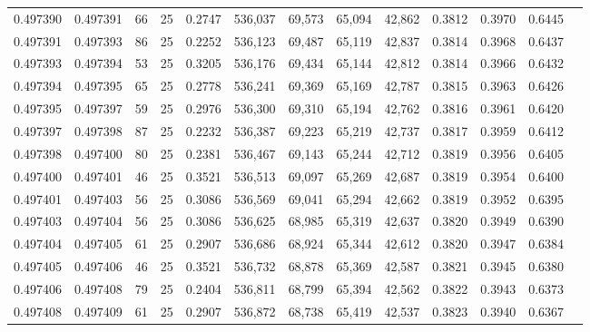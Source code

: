 \begin{tabular}{rrrrrrrrrrrrr}
0.497390 & 0.497391 &    66 &  25 &                                     0.2747 & 536,037 &  69,573 &  65,094 &  42,862 & 0.3812 & 0.3970 & 0.6445 \\
0.497391 & 0.497393 &    86 &  25 &                                     0.2252 & 536,123 &  69,487 &  65,119 &  42,837 & 0.3814 & 0.3968 & 0.6437 \\
0.497393 & 0.497394 &    53 &  25 &                                     0.3205 & 536,176 &  69,434 &  65,144 &  42,812 & 0.3814 & 0.3966 & 0.6432 \\
0.497394 & 0.497395 &    65 &  25 &                                     0.2778 & 536,241 &  69,369 &  65,169 &  42,787 & 0.3815 & 0.3963 & 0.6426 \\
0.497395 & 0.497397 &    59 &  25 &                                     0.2976 & 536,300 &  69,310 &  65,194 &  42,762 & 0.3816 & 0.3961 & 0.6420 \\
0.497397 & 0.497398 &    87 &  25 &                                     0.2232 & 536,387 &  69,223 &  65,219 &  42,737 & 0.3817 & 0.3959 & 0.6412 \\
0.497398 & 0.497400 &    80 &  25 &                                     0.2381 & 536,467 &  69,143 &  65,244 &  42,712 & 0.3819 & 0.3956 & 0.6405 \\
0.497400 & 0.497401 &    46 &  25 &                                     0.3521 & 536,513 &  69,097 &  65,269 &  42,687 & 0.3819 & 0.3954 & 0.6400 \\
0.497401 & 0.497403 &    56 &  25 &                                     0.3086 & 536,569 &  69,041 &  65,294 &  42,662 & 0.3819 & 0.3952 & 0.6395 \\
0.497403 & 0.497404 &    56 &  25 &                                     0.3086 & 536,625 &  68,985 &  65,319 &  42,637 & 0.3820 & 0.3949 & 0.6390 \\
0.497404 & 0.497405 &    61 &  25 &                                     0.2907 & 536,686 &  68,924 &  65,344 &  42,612 & 0.3820 & 0.3947 & 0.6384 \\
0.497405 & 0.497406 &    46 &  25 &                                     0.3521 & 536,732 &  68,878 &  65,369 &  42,587 & 0.3821 & 0.3945 & 0.6380 \\
0.497406 & 0.497408 &    79 &  25 &                                     0.2404 & 536,811 &  68,799 &  65,394 &  42,562 & 0.3822 & 0.3943 & 0.6373 \\
0.497408 & 0.497409 &    61 &  25 &                                     0.2907 & 536,872 &  68,738 &  65,419 &  42,537 & 0.3823 & 0.3940 & 0.6367 \\

\end{tabular}
